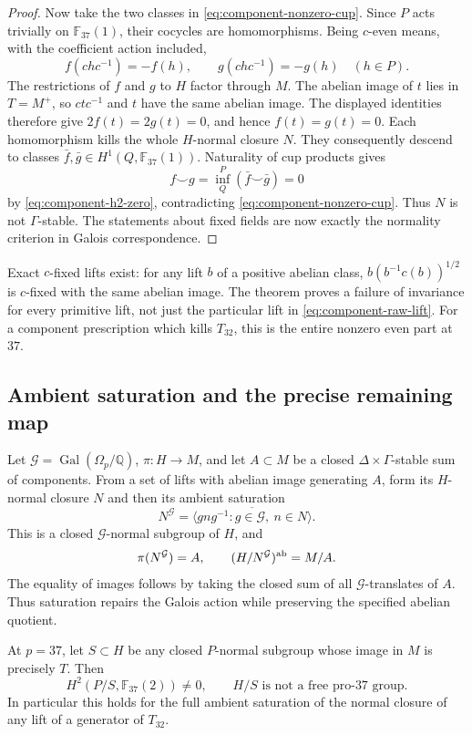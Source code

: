\begin{proof}
Now take the two classes in \eqref{eq:component-nonzero-cup}.
Since $P$ acts trivially on $\mathbb F_{37}(1)$, their cocycles
are homomorphisms.  Being $c$-even means, with the coefficient
action included,
\[
 f(chc^{-1})=-f(h),\qquad g(chc^{-1})=-g(h)
 \quad(h\in P).
\]
The restrictions of $f$ and $g$ to $H$ factor through $M$.
The abelian image of $t$ lies in $T=M^+$, so $ctc^{-1}$ and $t$
have the same abelian image.  The displayed identities therefore
give $2f(t)=2g(t)=0$, and hence $f(t)=g(t)=0$.
Each homomorphism kills the whole $H$-normal
closure $N$.  They consequently descend to classes
$\bar f,\bar g\in H^1(Q,\mathbb F_{37}(1))$.
Naturality of cup products gives
\[
 f\smile g=\operatorname{inf}_{Q}^{P}(\bar f\smile\bar g)=0
\]
by \eqref{eq:component-h2-zero}, contradicting
\eqref{eq:component-nonzero-cup}.  Thus $N$ is not
$\Gamma$-stable.  The statements about fixed fields are now
exactly the normality criterion in Galois correspondence.
\end{proof}

Exact $c$-fixed lifts exist: for any lift $b$ of a positive abelian class,
$b(b^{-1}c(b))^{1/2}$ is $c$-fixed with the same abelian image.
The theorem proves a failure of invariance for every primitive
lift, not just the particular lift in
\eqref{eq:component-raw-lift}.  For a component prescription which
kills $T_{32}$, this is the entire nonzero even part at $37$.

\subsection{Ambient saturation and the precise remaining map}

Let $\mathcal G=\operatorname{Gal}(\Omega_p/\mathbb Q)$,
$\pi:H\to M$, and let $A\subset M$ be a closed
$\Delta\times\Gamma$-stable sum of components.  From a set of
lifts with abelian image generating $A$, form its $H$-normal
closure $N$ and then its ambient saturation
\[
 N^{\mathcal G}=
 \overline{\langle gng^{-1}:g\in\mathcal G,\ n\in N\rangle}.
\]
This is a closed $\mathcal G$-normal subgroup of $H$, and
\[
 \pi(N^{\mathcal G})=A,\qquad
 (H/N^{\mathcal G})^{\rm ab}=M/A.
\]
The equality of images follows by taking the closed sum of all
$\mathcal G$-translates of $A$.  Thus saturation repairs the
Galois action while preserving the specified abelian quotient.

\begin{corollary}\label{cor:component-saturation-not-free}
At $p=37$, let $S\subset H$ be any closed $P$-normal subgroup
whose image in $M$ is precisely $T$.  Then
\[
 H^2(P/S,\mathbb F_{37}(2))\ne0,
 \qquad H/S\text{ is not a free pro-}37\text{ group}.
\]
In particular this holds for the full ambient saturation of
the normal closure of any lift of a generator of $T_{32}$.
\end{corollary}

